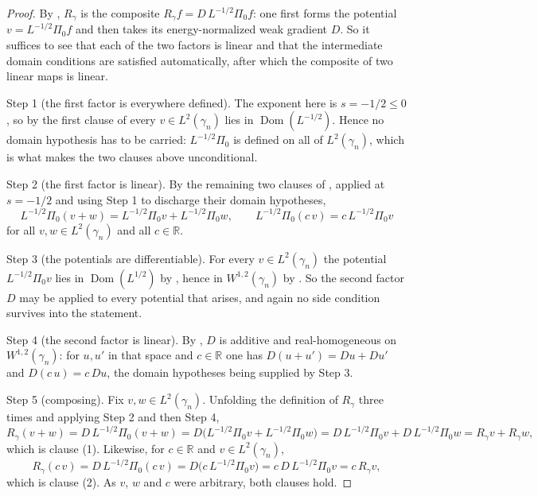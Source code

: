 \begin{proof}
By , $R_\gamma$ is the composite
$R_\gamma f = D\,L^{-1/2}\Pi_0 f$: one first forms the potential
$v = L^{-1/2}\Pi_0 f$ and then takes its energy-normalized weak gradient $D$.
So it suffices to see that each of the two factors is linear and that the
intermediate domain conditions are satisfied automatically, after which the
composite of two linear maps is linear.

Step 1 (the first factor is everywhere defined).  The exponent here is
$s = -1/2 \leq 0$, so by the first clause of  every
$v \in L^2(\gamma_n)$ lies in $\operatorname{Dom}(L^{-1/2})$.  Hence no domain
hypothesis has to be carried: $L^{-1/2}\Pi_0$ is defined on all of
$L^2(\gamma_n)$, which is what makes the two clauses above unconditional.

Step 2 (the first factor is linear).  By the remaining two clauses of
, applied at $s = -1/2$ and using Step 1 to discharge
their domain hypotheses,
\[
  L^{-1/2}\Pi_0 (v + w) = L^{-1/2}\Pi_0 v + L^{-1/2}\Pi_0 w,
  \qquad
  L^{-1/2}\Pi_0 (c\,v) = c\, L^{-1/2}\Pi_0 v
\]
for all $v, w \in L^2(\gamma_n)$ and all $c \in \mathbb{R}$.

Step 3 (the potentials are differentiable).  For every $v \in L^2(\gamma_n)$ the
potential $L^{-1/2}\Pi_0 v$ lies in $\operatorname{Dom}(L^{1/2})$ by
, hence in $W^{1,2}(\gamma_n)$ by
.  So the second factor $D$ may be applied to every
potential that arises, and again no side condition survives into the statement.

Step 4 (the second factor is linear).  By , $D$ is
additive and real-homogeneous on $W^{1,2}(\gamma_n)$: for $u, u'$ in that space
and $c \in \mathbb{R}$ one has $D(u + u') = Du + Du'$ and $D(c\,u) = c\,Du$,
the domain hypotheses being supplied by Step 3.

Step 5 (composing).  Fix $v, w \in L^2(\gamma_n)$.  Unfolding the definition of
$R_\gamma$ three times and applying Step 2 and then Step 4,
\[
  R_\gamma(v+w) = D\,L^{-1/2}\Pi_0(v+w)
    = D\bigl(L^{-1/2}\Pi_0 v + L^{-1/2}\Pi_0 w\bigr)
    = D\,L^{-1/2}\Pi_0 v + D\,L^{-1/2}\Pi_0 w
    = R_\gamma v + R_\gamma w ,
\]
which is clause (1).  Likewise, for $c \in \mathbb{R}$ and $v \in L^2(\gamma_n)$,
\[
  R_\gamma(c\,v) = D\,L^{-1/2}\Pi_0(c\,v)
    = D\bigl(c\,L^{-1/2}\Pi_0 v\bigr)
    = c\,D\,L^{-1/2}\Pi_0 v
    = c\,R_\gamma v ,
\]
which is clause (2).  As $v$, $w$ and $c$ were arbitrary, both clauses hold.
\end{proof}
